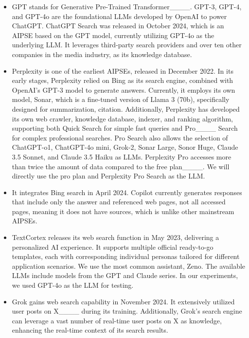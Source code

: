 \begin{itemize}[leftmargin=*]
    \item {} GPT stands for Generative Pre-Trained Transformer____.
    GPT-3, GPT-4, and GPT-4o are the foundational LLMs developed by OpenAI to power ChatGPT. 
    ChatGPT Search was released in October 2024, which is an AIPSE based on the GPT model, currently utilizing GPT-4o as the underlying LLM. 
    It leverages third-party search providers and over ten other companies in the media industry, as its knowledge database.
    \item {}
    Perplexity is one of the earliest AIPSEs, released in December 2022.
    In its early stages, Perplexity relied on Bing as its search engine, combined with OpenAI's GPT-3 model to generate answers. 
    Currently, it employs its own model, Sonar, which is a fine-tuned version of Llama 3 (70b), specifically designed for summarization, citation.
    Additionally, Perplexity has developed its own web crawler, knowledge database, indexer, and ranking algorithm, supporting both Quick Search for simple fast queries and Pro____ Search for complex professional searches.
    Pro Search also allows the selection of ChatGPT-o1,  ChatGPT-4o mini, Grok-2, Sonar Large, Sonor Huge,  Claude 3.5 Sonnet, and Claude 3.5 Haiku as LLMs.
    Perplexity Pro accesses more than twice the amount of data compared to the free plan____.
    We will directly use the pro plan and Perplexity Pro Search as the LLM.
    \item {} It integrates Bing search in April 2024. Copilot currently generates responses that include only the answer and referenced web pages, not all accessed pages, meaning it does not have sources, which is unlike other mainstream AIPSEs.
    \item {} TextCortex releases its web search function in May 2023, delivering a personalized AI experience.
    It supports multiple official ready-to-go templates, each with corresponding individual personas tailored for different application scenarios.
    We use the most common assistant, Zeno. The available LLMs include models from the GPT and Claude series. In our experiments, we used GPT-4o as the LLM for testing.
    \item {} Grok gains web search capability in November 2024.
    It extensively utilized user posts on X____ during its training.
    Additionally, Grok's search engine can leverage a vast number of real-time user posts on X as knowledge, enhancing the real-time context of its search results.

\end{itemize}
